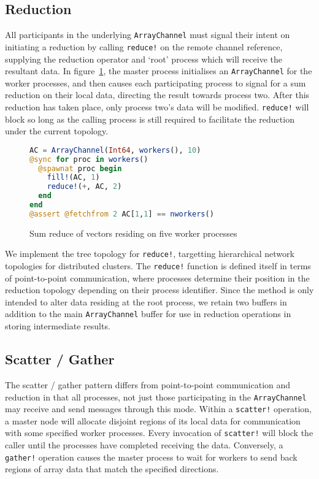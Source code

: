 \subsection{Reduction}
\label{sec:reduce}

All participants in the underlying \texttt{ArrayChannel} must signal
their intent on initiating a reduction by calling \texttt{reduce!} on
the remote channel reference, supplying the reduction operator and
`root' process which will receive the resultant data. In figure~\ref{code:reduce}, the master process initialises an
\texttt{ArrayChannel} for the worker processes, and then causes each
participating process to signal for a sum reduction on their local data,
directing the result towards process two. After this reduction has taken
place, only process two's data will be modified. \texttt{reduce!} will
block so long as the calling process is still required to facilitate the
reduction under the current topology.

\begin{figure}[htb]
  \begin{lstlisting}[language=Julia]
AC = ArrayChannel(Int64, workers(), 10)
@sync for proc in workers()
  @spawnat proc begin
    fill!(AC, 1)
    reduce!(+, AC, 2)
  end
end
@assert @fetchfrom 2 AC[1,1] == nworkers()
  \end{lstlisting}
  \caption{Sum reduce of vectors residing on five worker processes}
  \label{code:reduce}
\end{figure}

We implement the tree topology for \texttt{reduce!}, targetting
hierarchical network topologies for distributed clusters. The
\texttt{reduce!} function is defined itself in terms of point-to-point
communication, where processes determine their position in the reduction
topology depending on their process identifier. Since the method is only
intended to alter data residing at the root process, we retain two
buffers in addition to the main \texttt{ArrayChannel} buffer for use in
reduction operations in storing intermediate results.

\subsection{Scatter / Gather}
\label{sec:scatter-gather}

The scatter / gather pattern differs from point-to-point communication and reduction in that all processes, not just those participating in the \texttt{ArrayChannel} may receive and send messages through this mode. Within a \texttt{scatter!} operation, a master node will allocate disjoint regions of its local data for communication with some specified worker processes. Every invocation of \texttt{scatter!} will block the caller until the processes have completed receiving the data. Conversely, a \texttt{gather!} operation causes the master process to wait for workers to send back regions of array data that match the specified directions.

